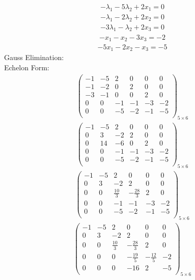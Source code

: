 \documentclass{article}
\begin{document}
\begin{align*}
-\lambda_{1} - 5\lambda_{2} + 2x_{1}=0\end{align*}
\begin{align*}
-\lambda_{1} - 2\lambda_{2} + 2x_{2}=0\end{align*}
\begin{align*}
-3\lambda_{1} - \lambda_{2} + 2x_{3}=0\end{align*}
\begin{align*}
-x_{1} - x_{2} - 3x_{3}=-2\end{align*}
\begin{align*}
-5x_{1} - 2x_{2} - x_{3}=-5\end{align*}
Gauss Elimination:\\
Echelon Form:\\
\begin{align*}
\left(
\begin{array}{ccccc|c}
-1 & -5 & 2 & 0 & 0 & 0\\
-1 & -2 & 0 & 2 & 0 & 0\\
-3 & -1 & 0 & 0 & 2 & 0\\
0 & 0 & -1 & -1 & -3 & -2\\
0 & 0 & -5 & -2 & -1 & -5\\
\end{array}
\right)_{5\times 6}
\end{align*}
\begin{align*}
\left(
\begin{array}{ccccc|c}
-1 & -5 & 2 & 0 & 0 & 0\\
0 & 3 & -2 & 2 & 0 & 0\\
0 & 14 & -6 & 0 & 2 & 0\\
0 & 0 & -1 & -1 & -3 & -2\\
0 & 0 & -5 & -2 & -1 & -5\\
\end{array}
\right)_{5\times 6}
\end{align*}
\begin{align*}
\left(
\begin{array}{ccccc|c}
-1 & -5 & 2 & 0 & 0 & 0\\
0 & 3 & -2 & 2 & 0 & 0\\
0 & 0 & \frac{10}{3} & -\frac{28}{3} & 2 & 0\\
0 & 0 & -1 & -1 & -3 & -2\\
0 & 0 & -5 & -2 & -1 & -5\\
\end{array}
\right)_{5\times 6}
\end{align*}
\begin{align*}
\left(
\begin{array}{ccccc|c}
-1 & -5 & 2 & 0 & 0 & 0\\
0 & 3 & -2 & 2 & 0 & 0\\
0 & 0 & \frac{10}{3} & -\frac{28}{3} & 2 & 0\\
0 & 0 & 0 & -\frac{19}{5} & -\frac{12}{5} & -2\\
0 & 0 & 0 & -16 & 2 & -5\\
\end{array}
\right)_{5\times 6}
\end{align*}
\end{document}
